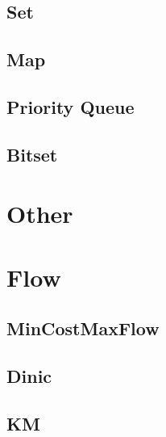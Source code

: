 \subsection{Set}


\subsection{Map}


\subsection{Priority Queue}


\subsection{Bitset}


\section{Other}


\section{Flow}

\subsection{MinCostMaxFlow}




\subsection{Dinic}




\subsection{KM}



